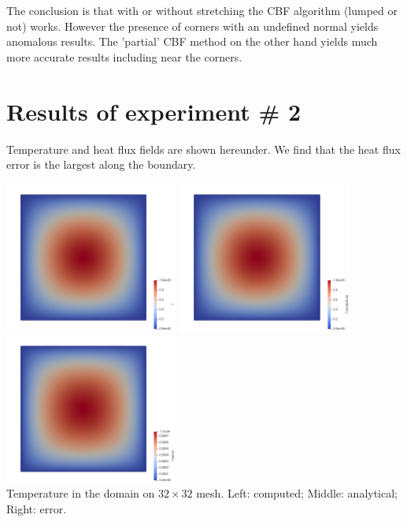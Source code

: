 The conclusion is that with or without stretching the CBF algorithm (lumped or not) works. 
However the presence of corners with an undefined normal yields anomalous results.
The 'partial' CBF method on the other hand yields much more accurate results including near the corners. 





\newpage
\section*{Results of experiment \# 2}

Temperature and heat flux fields are shown hereunder. 
We find that the heat flux error is the largest along the boundary.

\begin{center}
\includegraphics[width=5.7cm]{python_codes/fieldstone_173/results/exp2/T}
\includegraphics[width=5.7cm]{python_codes/fieldstone_173/results/exp2/T_analytical}
\includegraphics[width=5.7cm]{python_codes/fieldstone_173/results/exp2/T_error}\\
{\captionfont Temperature in the domain on $32 \times 32$ mesh. 
Left: computed; Middle: analytical; Right: error.}
\end{center}

